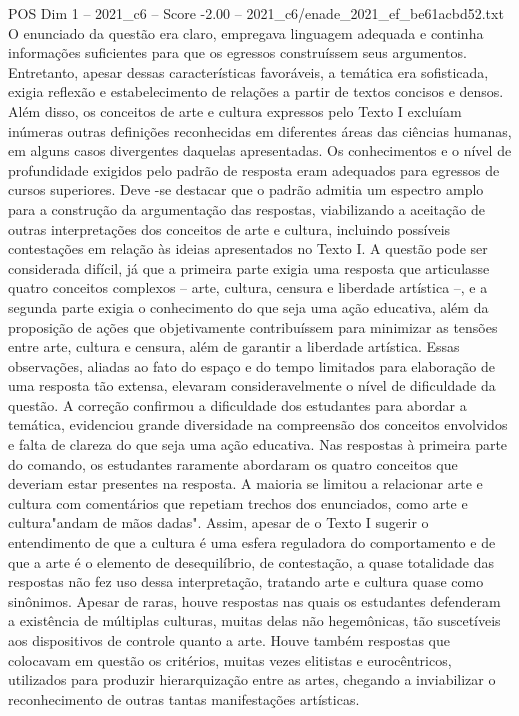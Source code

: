 \begin{textsample}{POS Dim 1 – 2021\_c6 – Score -2.00 – 2021\_c6/enade\_2021\_ef\_be61acbd52.txt}
O enunciado da questão era claro, empregava linguagem adequada e continha informações suficientes para que os egressos construíssem seus argumentos.
Entretanto, apesar dessas características favoráveis, a temática era sofisticada, exigia reflexão e estabelecimento de relações a partir de textos concisos e densos.
Além disso, os conceitos de arte e cultura expressos pelo Texto I excluíam inúmeras outras definições reconhecidas em diferentes áreas das ciências humanas, em alguns casos divergentes daquelas apresentadas.
Os conhecimentos e o nível de profundidade exigidos pelo padrão de resposta eram adequados para egressos de cursos superiores.
Deve -se destacar que o padrão admitia um espectro amplo para a construção da argumentação das respostas, viabilizando a aceitação de outras interpretações dos conceitos de arte e cultura, incluindo possíveis contestações em relação às ideias apresentados no Texto I.
A questão pode ser considerada difícil, já que a primeira parte exigia uma resposta que articulasse quatro conceitos complexos – arte, cultura, censura e liberdade artística –, e a segunda parte exigia o conhecimento do que seja uma ação educativa, além da proposição de ações que objetivamente contribuíssem para minimizar as tensões entre arte, cultura e censura, além de garantir a liberdade artística.
Essas observações, aliadas ao fato do espaço e do tempo limitados para elaboração de uma resposta tão extensa, elevaram consideravelmente o nível de dificuldade da questão.
A correção confirmou a dificuldade dos estudantes para abordar a temática, evidenciou grande diversidade na compreensão dos conceitos envolvidos e falta de clareza do que seja uma ação educativa.
Nas respostas à primeira parte do comando, os estudantes raramente abordaram os quatro conceitos que deveriam estar presentes na resposta.
A maioria se limitou a relacionar arte e cultura com comentários que repetiam trechos dos enunciados, como arte e cultura"andam de mãos dadas".
Assim, apesar de o Texto I sugerir o entendimento de que a cultura é uma esfera reguladora do comportamento e de que a arte é o elemento de desequilíbrio, de contestação, a quase totalidade das respostas não fez uso dessa interpretação, tratando arte e cultura quase como sinônimos.
Apesar de raras, houve respostas nas quais os estudantes defenderam a existência de múltiplas culturas, muitas delas não hegemônicas, tão suscetíveis aos dispositivos de controle quanto a arte.
Houve também respostas que colocavam em questão os critérios, muitas vezes elitistas e eurocêntricos, utilizados para produzir hierarquização entre as artes, chegando a inviabilizar o reconhecimento de outras tantas manifestações artísticas.

\end{textsample}
